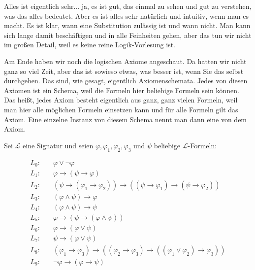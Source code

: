 \begin{spoken-clean}[00:04:30 - 00:06:45]
Alles ist eigentlich sehr... ja, es ist gut, das einmal zu sehen und gut zu verstehen, was das alles bedeutet. Aber es ist alles sehr natürlich und intuitiv, wenn man es macht. Es ist klar, wann eine Substitution zulässig ist und wann nicht. Man kann sich lange damit beschäftigen und in alle Feinheiten gehen, aber das tun wir nicht im großen Detail, weil es keine reine Logik-Vorlesung ist.

Am Ende haben wir noch die logischen Axiome angeschaut. Da hatten wir nicht ganz so viel Zeit, aber das ist sowieso etwas, was besser ist, wenn Sie das selbst durchgehen. Das sind, wie gesagt, eigentlich Axiomenschemata. Jedes von diesen Axiomen ist ein Schema, weil die Formeln hier beliebige Formeln sein können. Das heißt, jedes Axiom besteht eigentlich aus ganz, ganz vielen Formeln, weil man hier alle möglichen Formeln einsetzen kann und für alle Formeln gilt das Axiom. Eine einzelne Instanz von diesem Schema nennt man dann eine  von dem Axiom.
\end{spoken-clean}

\begin{math-stroke}
Sei $\mathcal{L}$ eine Signatur und seien $\varphi, \varphi_1, \varphi_2, \varphi_3$ und $\psi$ beliebige $\mathcal{L}$-Formeln:

\begin{align}
    L_0: &\quad \varphi \vee \neg \varphi \nonumber \\
    L_1: &\quad \varphi \rightarrow (\psi \rightarrow \varphi) \nonumber \\
    L_2: &\quad (\psi \rightarrow (\varphi_1 \rightarrow \varphi_2)) \rightarrow ((\psi \rightarrow \varphi_1) \rightarrow (\psi \rightarrow \varphi_2)) \nonumber \\
    L_3: &\quad (\varphi \wedge \psi) \rightarrow \varphi \nonumber \\
    L_4: &\quad (\varphi \wedge \psi) \rightarrow \psi \nonumber \\
    L_5: &\quad \varphi \rightarrow (\psi \rightarrow (\varphi \wedge \psi)) \nonumber \\
    L_6: &\quad \varphi \rightarrow (\varphi \vee \psi) \nonumber \\
    L_7: &\quad \psi \rightarrow (\varphi \vee \psi) \nonumber \\
    L_8: &\quad (\varphi_1 \rightarrow \varphi_3) \rightarrow ((\varphi_2 \rightarrow \varphi_3) \rightarrow ((\varphi_1 \vee \varphi_2) \rightarrow \varphi_3)) \nonumber \\
    L_9: &\quad \neg \varphi \rightarrow (\varphi \rightarrow \psi) \nonumber
\end{align}
\end{math-stroke}

